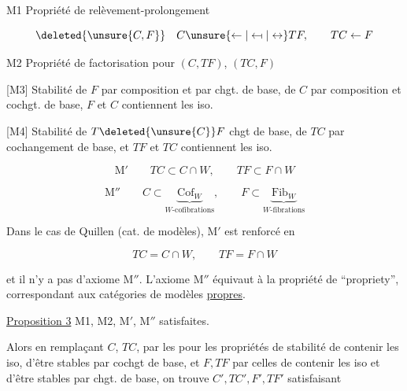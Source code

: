 

M1 \quad Propriété de relèvement-prolongement

\[ \deleted{\unsure{C,F}} \quad C\unsure{\leftarrow|\leftarrow\!\shortmid|\leftrightarrow}TF,\qquad TC\leftarrow F \]

M2 \quad Propriété de factorisation pour $(C,TF)$, $(TC,F)$

[M3] \quad Stabilité de $F$ par composition et par chgt. de base, de $C$ par composition et cochgt. de base,  $F$ et $C$ contiennent les iso.

[M4] \quad Stabilité de $T\deleted{\unsure{C}}F$   chgt de base, de $TC$ par  cochangement de base, et $TF$ et $TC$ contiennent les iso.

\[ \mathrm M'\qquad TC\subset C\cap W,\qquad TF\subset F\cap W \]

\[ \mathrm M''\qquad C\subset\underbrace{\mathrm{Cof}_W}_{W\text{-cofibrations}},\qquad F\subset\underbrace{\mathrm{Fib}_W}_{W\text{-fibrations}} \]

Dans le cas de Quillen (cat. de modèles), M$'$ est renforcé en

\[ TC=C\cap W,\qquad TF=F\cap W \]

et il n'y a pas d'axiome M$''$. L'axiome M$''$ équivaut à la propriété de ``propriety'',  correspondant aux catégories de modèles \uline{propres}.

\uline{Proposition 3}   M1, M2, M$'$, M$''$ satisfaites.

Alors en remplaçant $C$,  $TC$,  par les  pour les propriétés de stabilité de contenir les iso,  d'être stables par  cochgt de base,  et $F,TF$ par celles de contenir les iso et d'être stables par  chgt. de base, on trouve  $C',TC',F',TF'$ satisfaisant


